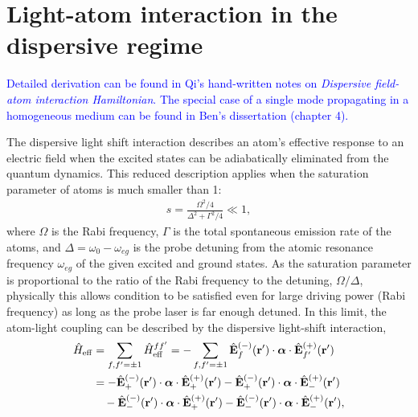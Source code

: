 \documentclass[preprint,aps,pra,onecolumn]{revtex4-1} %
\renewcommand{\tensor}[1]{\boldsymbol{#1}}
\begin{document}

\section{Light-atom interaction in the dispersive regime}\label{sec:lightatominteract}
\textcolor{blue}{Detailed derivation can be found in Qi's hand-written notes on \textit{Dispersive field-atom interaction Hamiltonian}. The special case of a single mode propagating in a homogeneous medium can be found in Ben's dissertation (chapter 4). }


The dispersive light shift interaction describes an atom's effective response to an electric field when the excited states can be adiabatically eliminated from the quantum dynamics.  This reduced description applies when the saturation parameter of atoms is much smaller than 1:
\begin{align} \label{Eq::SatParameter}
	s = \frac{ \Omega^2/4}{\Delta^2 + \Gamma^2/4} \ll 1,  
\end{align}
where $\Omega$ is the Rabi frequency, $\Gamma$ is the total spontaneous emission rate of the atoms, and $\Delta = \omega_0 - \omega_{eg}$ is the probe detuning from the atomic resonance frequency $\omega_{eg}$ of the given excited and ground states. As the saturation parameter is proportional to the ratio of the Rabi frequency to the detuning, $\Omega/\Delta$, physically this allows condition  to be satisfied even for large driving power (Rabi frequency) as long as the probe laser is far enough detuned.  In this limit, the atom-light coupling can be described by the dispersive light-shift interaction,
\begin{align} 
	\hat{H}_{\rm eff} & = \sum_{f,f'=\pm 1}\hat{H}_{\rm eff}^{ff'} =- \sum_{f,f'=\pm 1}\hat{\mathbf{E}}^{(-)}_f(\mathbf{r}' ) \cdot \tensor{\alpha} \cdot \hat{\mathbf{E}}^{(+)}_{f'}(\mathbf{r}' )\\
	&= - \hat{\mathbf{E}}^{(-)}_+(\mathbf{r}' ) \cdot \tensor{\alpha} \cdot \hat{\mathbf{E}}^{(+)}_+(\mathbf{r}' )
	- \hat{\mathbf{E}}^{(-)}_+(\mathbf{r}' ) \cdot \tensor{\alpha} \cdot \hat{\mathbf{E}}^{(+)}_-(\mathbf{r}' )\nonumber\\
	&\quad - \hat{\mathbf{E}}^{(-)}_-(\mathbf{r}' ) \cdot \tensor{\alpha} \cdot \hat{\mathbf{E}}^{(+)}_+(\mathbf{r}' )
	- \hat{\mathbf{E}}^{(-)}_-(\mathbf{r}' ) \cdot \tensor{\alpha} \cdot \hat{\mathbf{E}}^{(+)}_-(\mathbf{r}' ), \label{Eq::LightShiftHam}
\end{align}
\end{document}
